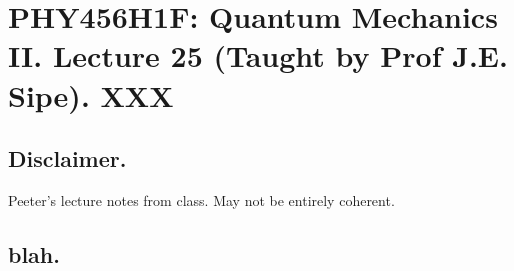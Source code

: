 
%

\chapter{PHY456H1F: Quantum Mechanics II.  Lecture 25 (Taught by Prof J.E. Sipe).  XXX}
\label{chap:qmTwoL25}
\date{Dec 7, 2011}

\beginArtWithToc

\section{Disclaimer.}

Peeter's lecture notes from class.  May not be entirely coherent.

\section{blah.}

\cite{desai2009quantum}

\EndArticle
